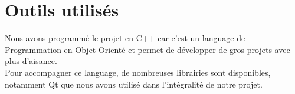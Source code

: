 \section{Outils utilisés}

Nous avons programmé le projet en C++ car c'est un language de Programmation en Objet Orienté et permet de développer de gros projets avec plus d'aisance. \\

Pour accompagner ce language, de nombreuses librairies sont disponibles, notamment Qt que nous avons utilisé dans l'intégralité de notre projet.


\newpage


\newpage


\newpage


\newpage


\newpage
